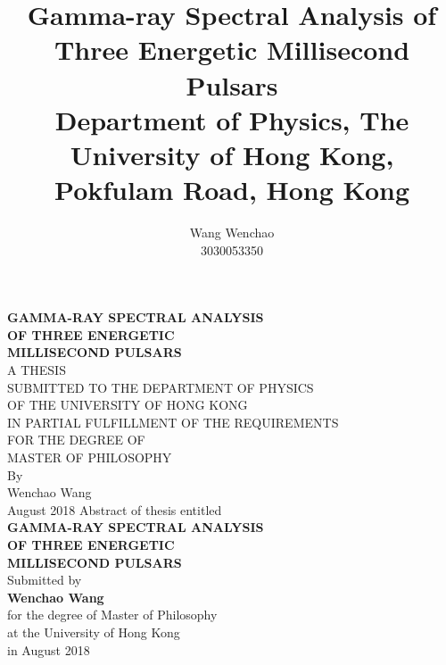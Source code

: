 \documentclass[a4paper, 12pt]{report}
\title{\textbf{Gamma-ray Spectral Analysis of Three Energetic Millisecond Pulsars} \\ \vspace{1cm}
  {\large Department of Physics, The University of Hong Kong, Pokfulam Road, Hong Kong}}
\date{}
\author{Wang Wenchao  \\3030053350}
\begin{document}
\begin{titlepage}
  \begin{center}
  \vspace*{3cm}
  \Large \textbf{GAMMA-RAY SPECTRAL ANALYSIS 
    \\[0.5cm] OF THREE ENERGETIC \\ [0.5cm] 
    MILLISECOND PULSARS \\[3.7cm]}
  \small
    A THESIS \\[0.5cm] 
    SUBMITTED TO THE DEPARTMENT OF PHYSICS \\[0.5cm]
    OF THE UNIVERSITY OF HONG KONG \\[0.5CM]
    IN PARTIAL FULFILLMENT OF THE REQUIREMENTS \\[0.5cm]
    FOR THE DEGREE OF \\[0.5cm]
    MASTER OF PHILOSOPHY \\[4.2cm]

    By \\[0.5cm]
    \large Wenchao Wang \\[0.5cm]
    August 2018
    \newpage 
    \centering 
    Abstract of thesis entitled \\[1.2cm]
    \Large \textbf{GAMMA-RAY SPECTRAL ANALYSIS 
    \\[0.5cm] OF THREE ENERGETIC \\ [0.5cm] 
    MILLISECOND PULSARS \\[0.5cm]}
    \normalsize Submitted by \\ [0.5cm]
    \Large \textbf{Wenchao Wang} \\[1cm]
    \normalsize for the degree of Master of Philosophy \\[0.5cm]
    at the University of Hong Kong \\[0.5cm]
    in August 2018 \\[1.9cm]
  \end{center}


\end{titlepage}
\end{document}
